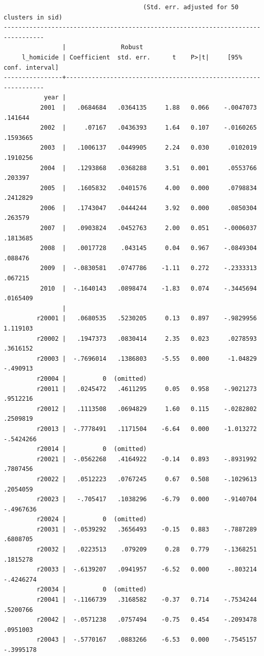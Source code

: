 \documentclass[
]{book}
\begin{document}
\begin{verbatim}
                                      (Std. err. adjusted for 50 clusters in sid)
---------------------------------------------------------------------------------
                |               Robust
     l_homicide | Coefficient  std. err.      t    P>|t|     [95% conf. interval]
----------------+----------------------------------------------------------------
           year |
          2001  |   .0684684   .0364135     1.88   0.066    -.0047073     .141644
          2002  |     .07167   .0436393     1.64   0.107    -.0160265    .1593665
          2003  |   .1006137   .0449905     2.24   0.030     .0102019    .1910256
          2004  |   .1293868   .0368288     3.51   0.001     .0553766     .203397
          2005  |   .1605832   .0401576     4.00   0.000     .0798834    .2412829
          2006  |   .1743047   .0444244     3.92   0.000     .0850304     .263579
          2007  |   .0903824   .0452763     2.00   0.051    -.0006037    .1813685
          2008  |   .0017728    .043145     0.04   0.967    -.0849304     .088476
          2009  |  -.0830581   .0747786    -1.11   0.272    -.2333313     .067215
          2010  |  -.1640143   .0898474    -1.83   0.074    -.3445694    .0165409
                |
         r20001 |   .0680535   .5230205     0.13   0.897    -.9829956    1.119103
         r20002 |   .1947373   .0830414     2.35   0.023     .0278593    .3616152
         r20003 |  -.7696014   .1386803    -5.55   0.000     -1.04829    -.490913
         r20004 |          0  (omitted)
         r20011 |   .0245472   .4611295     0.05   0.958    -.9021273    .9512216
         r20012 |   .1113508   .0694829     1.60   0.115    -.0282802    .2509819
         r20013 |  -.7778491   .1171504    -6.64   0.000    -1.013272   -.5424266
         r20014 |          0  (omitted)
         r20021 |  -.0562268   .4164922    -0.14   0.893    -.8931992    .7807456
         r20022 |   .0512223   .0767245     0.67   0.508    -.1029613    .2054059
         r20023 |   -.705417   .1038296    -6.79   0.000    -.9140704   -.4967636
         r20024 |          0  (omitted)
         r20031 |  -.0539292   .3656493    -0.15   0.883    -.7887289    .6808705
         r20032 |   .0223513    .079209     0.28   0.779    -.1368251    .1815278
         r20033 |  -.6139207   .0941957    -6.52   0.000     -.803214   -.4246274
         r20034 |          0  (omitted)
         r20041 |  -.1166739   .3168582    -0.37   0.714    -.7534244    .5200766
         r20042 |  -.0571238   .0757494    -0.75   0.454    -.2093478    .0951003
         r20043 |  -.5770167   .0883266    -6.53   0.000    -.7545157   -.3995178

\end{verbatim}
\end{document}
